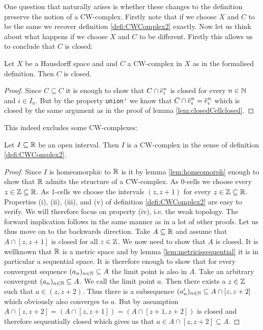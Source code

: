 One question that naturally arises is whether these changes to the definition preserve the notion of a CW-complex. 
Firstly note that if we choose $X$ and $C$ to be the same we recover definition \ref{defi:CWComplex2} exactly. 
Now let us think about what happens if we choose $X$ and $C$ to be different. 
Firstly this allows us to conclude that $C$ is closed: 

\begin{lem} \label{lem:Cclosed}
  Let $X$ be a Hausdorff space and and $C$ a CW-complex in $X$ as in the formalised definition. 
  Then $C$ is closed.
\end{lem}
\begin{proof}
  Since $C \subseteq C$ it is enough to show that $C \cap \closedCell{n}{i}$ is closed for every $n \in \bN$ and $i \in I_n$. 
  But by the property \lstinline{union'} we know that $C \cap \closedCell{n}{i} = \closedCell{n}{i}$ which is closed by the same argument as in the proof of lemma \ref{lem:closedCellclosed}.
\end{proof}

This indeed excludes some CW-complexes: 

\begin{example}
  Let $I \subseteq \bR$ be an open interval. 
  Then $I$ is a CW-complex in the sense of definition \ref{defi:CWComplex2}.
\end{example}
\begin{proof}
  Since $I$ is homeomorphic to $\bR$ is it by lemma \ref{lem:homeomorph} enough to show that $\bR$ admits the structure of a CW-complex. 
  As $0$-cells we choose every $z \in \bZ \subseteq \bR$. 
  As $1$-cells we choose the intervals $(z, z + 1)$ for every $z \in \bZ \subseteq \bR$.  
  Properties (i), (ii), (iii), and (v) of definition \ref{defi:CWComplex2} are easy to verify. 
  We will therefore focus on property (iv), i.e. the weak topology. 
  The forward implication follows in the same manner as in a lot of other proofs. 
  Let us thus move on to the backwards direction. 
  Take $A \subseteq \bR$ and assume that $A \cap [z, z + 1]$ is closed for all $z \in \bZ$. 
  We now need to show that $A$ is closed.
  It is wellknown that $\bR$ is a metric space and by lemma \ref{lem:metricissequential} it is in particular a sequential space. 
  It is therefore enough to show that for every convergent sequence $(a_n)_{n \in \bN} \subseteq A$ the limit point is also in $A$. 
  Take an arbitrary convergent $(a_n)_{n \in \bN} \subseteq A$. 
  We call the limit point $a$.
  Then there exists a $z \in \bZ$ such that $a \in (z, z + 2)$. 
  Thus there is a subsequence $(a'_n)_{n \in \bN} \subseteq A \cap [z, z + 2]$ which obviously also converges to $a$. 
  But by assumption $A \cap [z, z + 2] = (A \cap [z, z + 1]) = (A \cap [z + 1, z + 2])$ is closed and therefore sequentially closed which gives us that $a \in A \cap [z, z + 2] \subseteq A$.
\end{proof}


